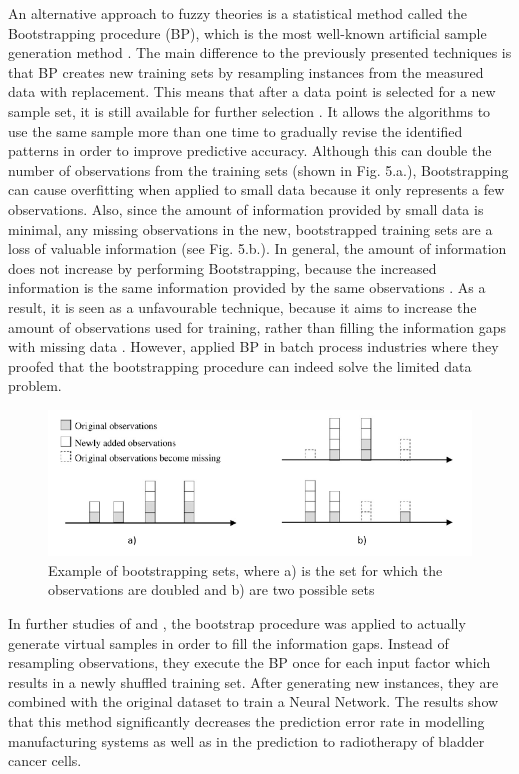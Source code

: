 \documentclass[parskip=full]{scrartcl}
\begin{document}
An alternative approach to fuzzy theories is a statistical method called the 
Bootstrapping procedure (BP), which is the most well-known artificial sample 
generation method \cite{AbdulLateh.2017}. The main difference to the previously 
presented techniques is that BP creates new training sets by resampling 
instances from the measured data with replacement. This means that after a data 
point is selected for a new sample set, it is still available for further 
selection \cite{Efron.1993}. It allows the algorithms to use the same sample 
more than one time to gradually revise the identified patterns in order to 
improve predictive accuracy. Although this can double the number of 
observations from the training sets (shown in Fig. 5.a.), Bootstrapping can 
cause overfitting when applied to small data because it only represents a few 
observations. Also, since the amount of information provided by small data is 
minimal, any missing observations in the new, bootstrapped training sets are a 
loss of valuable information (see Fig. 5.b.). In general, the amount of 
information does not increase by performing Bootstrapping, because the 
increased information is the same information provided by the same observations 
\cite{Li.2018}. As a result, it is seen as a unfavourable technique, because it 
aims to increase the amount of observations used for training, rather than 
filling the information gaps with missing data \cite{Tsai.2015}. However, 
\cite{Ivanescu.2006} applied BP in batch process industries where they proofed 
that the bootstrapping procedure can indeed solve the limited data problem.

\begin{figure}[H]
	\centering
	\includegraphics[width=0.9\linewidth]{resources/bootstrapping_example}
	\caption{Example of bootstrapping sets, where a) is the set for which the 
	observations are doubled and b) are two possible sets}
	\label{fig:bootstrappingexample}
\end{figure}

In further studies of \cite{Tsai.2008} and \cite{Chao.2011}, the bootstrap 
procedure was applied to actually generate virtual samples in order to fill the 
information gaps. Instead of resampling observations, they execute the BP once 
for each input factor which results in a newly shuffled training set. After 
generating new instances, they are combined with the original dataset to train 
a Neural Network. The results show that this method significantly decreases the 
prediction error rate in modelling manufacturing systems as well as in the 
prediction to radiotherapy of bladder cancer cells.
\end{document}
